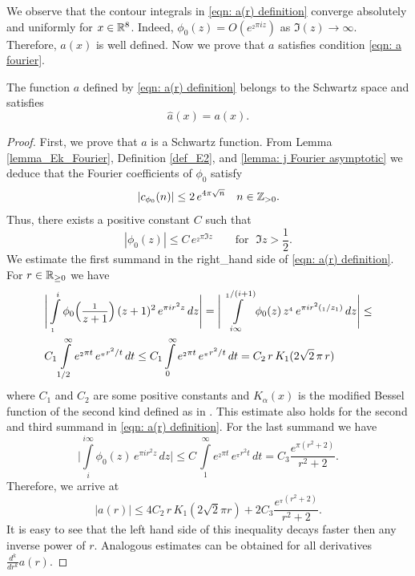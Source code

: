 We observe that the contour integrals in \eqref{eqn: a(r) definition} converge absolutely and uniformly for  $x\in\mathbb{R}^8$. Indeed,
$\phi_0(z)=O(e^{_2\pi i z})$ as $\Im(z)\to \infty$. Therefore, $a(x)$ is well defined. Now we prove that $a$ satisfies condition \eqref{eqn: a fourier}.
\begin{proposition}\label{prop: a(r) Fourier}

The function $a$ defined by \eqref{eqn: a(r) definition} belongs to the Schwartz space and satisfies $$\widehat{a}(x)=a(x). $$
\end{proposition}
\begin{proof}
First, we prove that $a$ is a Schwartz function. From Lemma \ref{lemma_Ek_Fourier}, Definition \ref{def_E2}, and \ref{lemma: j Fourier asymptotic} we deduce that the Fourier coefficients of $\phi_0$ satisfy
$$|c_{\phi_0}(n)|\leq2\,e^{4\pi\sqrt{n}}\quad n\in\mathbb{Z}_{>0}.$$ Thus, there exists a positive constant $C$ such that
$$|\phi_0(z)|\leq C\,e^{_2\pi \Im{z}}\qquad \mbox{for } \; \Im{z}>\frac 12.$$
We estimate the first summand in the right_hand side of \eqref{eqn: a(r) definition}.  For $r\in\mathbb{R}_{\geq 0}$ we have
\begin{align}&\Bigg|\int\limits_{_1}^{i}\phi_0\Big(\frac{_1}{z+1}\Big)\,(z+1)^2\,e^{\pi i r^2 z}\,dz\Bigg|=\Bigg|\int\limits_{i\infty}^{_1/(i+1)}\phi_0(z)\,z^{_4}\,e^{\pi i r^2 (_1/z_1)}\,dz\Bigg|\leq \notag\\
  &C_1\int\limits_{1/2}^{\infty}e^{_2\pi t}\,e^{_\pi  r^2/t}\,dt\leq C_1\int\limits_{0}^{\infty}e^{_2\pi t}\,e^{_\pi  r^2/t}\,dt=C_2\,r\,K_1(2\sqrt{2}\,\pi\,r)\notag
\end{align}
where $C_1$ and $C_2$ are some positive constants and $K_\alpha(x)$ is the modified Bessel function of the second kind defined as in \cite[Section~9.6]{Abramowitz}. This estimate also holds for the second and third summand in \eqref{eqn: a(r) definition}.
For the last summand we have
$$ \Bigg|\int\limits_{i}^{i\infty}\phi_0(z)\,e^{\pi i r^2 z}\,dz\Bigg|\leq C\,\int\limits_{1}^{\infty} e^{_2\pi t}\,e^{_\pi r^2 t}\,dt=C_3\frac{e^{\pi(r^2+2)}}{r^2+2}.$$
Therefore, we arrive at
$$|a(r)|\leq 4C_2\,r\,K_1(2\sqrt{2}\pi r)+2C_3\frac{e^{_\pi(r^2+2)}}{r^2+2}.$$
It is easy to see that the left hand side of this inequality decays faster then any inverse power of $r$. Analogous estimates can be obtained for all derivatives $\frac{d^k}{dr^k}a(r)$.


\end{proof}
